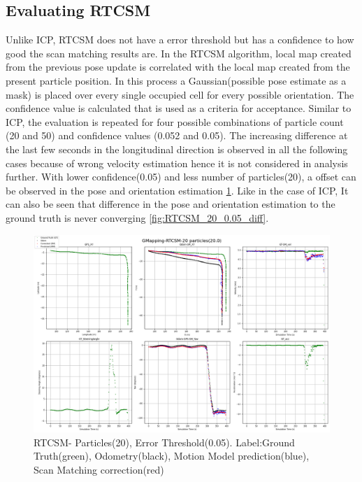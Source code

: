 \subsection{Evaluating RTCSM}
Unlike ICP, RTCSM does not have a error threshold but has a confidence to how good the scan matching results are. In the RTCSM algorithm, local map created from the previous pose update is correlated with the local map created from the present particle position. In this process a Gaussian(possible pose estimate as a mask) is placed over every single occupied cell for every possible orientation. The confidence value is calculated that is used as a criteria for acceptance. Similar to ICP, the evaluation is repeated for four possible combinations of particle count (20 and 50) and confidence values (0.052 and 0.05). The increasing difference at the last few seconds in the longitudinal direction is observed in all the following cases because of wrong velocity estimation hence it is not considered in analysis further.
With lower confidence(0.05) and less number of particles(20), a offset can be observed in the pose and orientation estimation \ref{fig:RTCSM_20_0.05}. Like in the case of ICP, It can also be seen that difference in the pose and orientation estimation to the ground truth is never converging \ref{fig:RTCSM_20_0.05_diff}.
    \begin{figure}[h] 
        \includegraphics[height=0.6\textwidth]{images/GMapping-RTCSM-20 particles(20.0)_PositionParameters.png}
        \caption{RTCSM- Particles(20), Error Threshold(0.05). Label:Ground Truth(green), Odometry(black), Motion Model prediction(blue), Scan Matching correction(red)}
        \label{fig:RTCSM_20_0.05}
    \end{figure}
